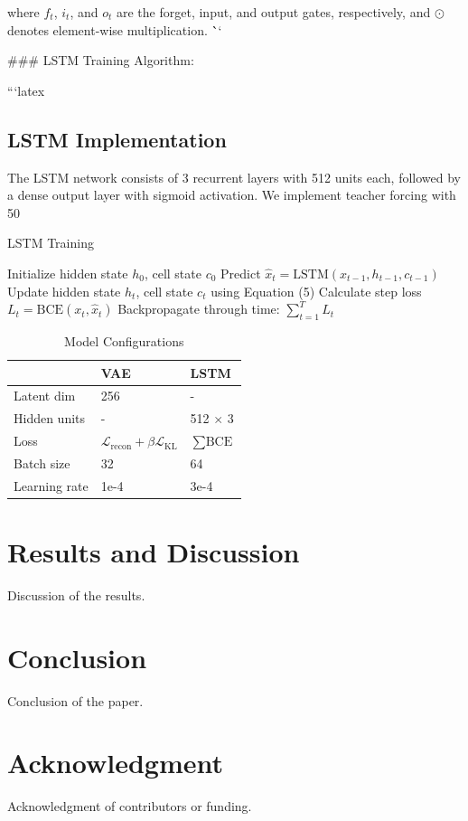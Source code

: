 \documentclass[conference]{IEEEtran}
\begin{document}
where $f_t$, $i_t$, and $o_t$ are the forget, input, and output gates, respectively, and $\odot$ denotes element-wise multiplication. 
\```

### LSTM Training Algorithm:

```latex
\subsection{LSTM Implementation}
The LSTM network consists of 3 recurrent layers with 512 units each, followed by a dense output layer with sigmoid activation. We implement teacher forcing with 50%

\begin{algorithm}[H]
\caption{LSTM Training}
\begin{algorithmic}[1]
\STATE Initialize hidden state $h_0$, cell state $c_0$
        \STATE Predict $\hat{x}_t = \text{LSTM}(x_{t-1}, h_{t-1}, c_{t-1})$
        \STATE Update hidden state $h_t$, cell state $c_t$ using Equation (5)
        \STATE Calculate step loss $L_t = \text{BCE}(x_t, \hat{x}_t)$
    \ENDFOR
    \STATE Backpropagate through time: $\sum_{t=1}^{T} L_t$
\ENDFOR
\end{algorithmic}
\end{algorithm}
\begin{table}[h]
\caption{Model Configurations}
\label{tab:config}
\centering
\begin{tabular}{l|ll}
& VAE & LSTM \\
\hline
Latent dim & 256 & - \\
Hidden units & - & 512 $\times$ 3 \\
Loss & $\mathcal{L}_{\text{recon}} + \beta \mathcal{L}_{\text{KL}}$ & $\sum \text{BCE}$ \\
Batch size & 32 & 64 \\
Learning rate & 1e-4 & 3e-4 \\
\end{tabular}
\end{table}




\section{Results and Discussion}
Discussion of the results.

\section{Conclusion}
Conclusion of the paper.

\section*{Acknowledgment}
Acknowledgment of contributors or funding.



\end{document}
